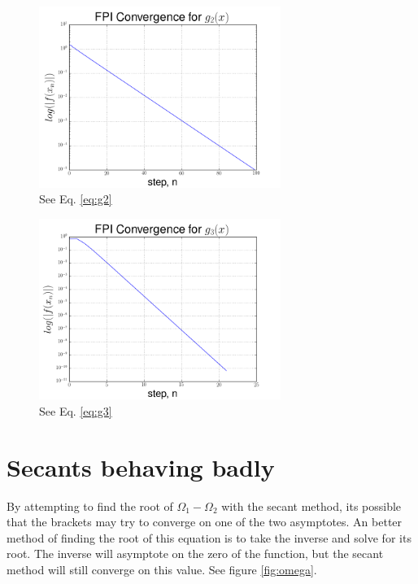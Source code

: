 \documentclass[12pt]{article}
\begin{document}
  \begin{figure}[h]
    \centering
    \includegraphics[width=0.7\textwidth]{Problem5b.png}
    \caption{See Eq. \ref{eq:g2}}
  \end{figure}

  \begin{figure}[h]
    \centering
    \includegraphics[width=0.7\textwidth]{Problem5c.png}
    \caption{See Eq. \ref{eq:g3}}
  \end{figure}

  \clearpage

  \section{Secants behaving badly}

  By attempting to find the root of $\Omega_1 - \Omega_2$ with the secant method,
  its possible that the brackets may try to converge on one of the two
  asymptotes.
  An better method of finding the root of this equation is to take the inverse
  and solve for its root. The inverse will asymptote on the zero of the 
  function, but the secant method will still converge on this value.
  See figure \ref{fig:omega}.
\end{document}

